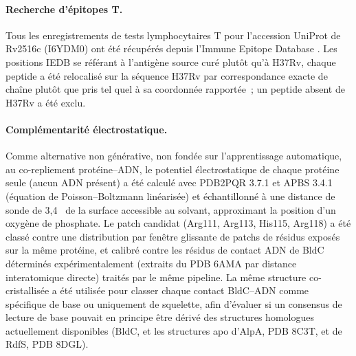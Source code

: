\documentclass[11pt,a4paper]{article}
\newcommand{\ang}{\text{\AA}}
\begin{document}
\paragraph{Recherche d'épitopes T.} Tous les enregistrements de tests lymphocytaires T pour
l'accession UniProt de Rv2516c (I6YDM0) ont été récupérés depuis l'Immune Epitope Database
\citep{vita2019iedb}. Les positions IEDB se référant à l'antigène source curé plutôt qu'à H37Rv,
chaque peptide a été relocalisé sur la séquence H37Rv par correspondance exacte de chaîne plutôt que
pris tel quel à sa coordonnée rapportée~; un peptide absent de H37Rv a été exclu.

\paragraph{Complémentarité électrostatique.} Comme alternative non générative, non fondée sur
l'apprentissage automatique, au co-repliement protéine--ADN, le potentiel électrostatique de chaque
protéine seule (aucun ADN présent) a été calculé avec PDB2PQR 3.7.1 et APBS 3.4.1 (équation de
Poisson--Boltzmann linéarisée) \citep{jurrus2018apbs} et échantillonné à une distance de sonde de
3,4~\ang{} de la surface accessible au solvant, approximant la position d'un oxygène de phosphate.
Le patch candidat (Arg111, Arg113, His115, Arg118) a été classé contre une distribution par fenêtre
glissante de patchs de résidus exposés sur la même protéine, et calibré contre les résidus de
contact ADN de BldC déterminés expérimentalement (extraits du PDB 6AMA par distance interatomique
directe) traités par le même pipeline. La même structure co-cristallisée a été utilisée pour
classer chaque contact BldC--ADN comme spécifique de base ou uniquement de squelette, afin d'évaluer
si un consensus de lecture de base pouvait en principe être dérivé des structures homologues
actuellement disponibles (BldC, et les structures apo d'AlpA, PDB 8C3T, et de RdfS, PDB 8DGL).
\end{document}
